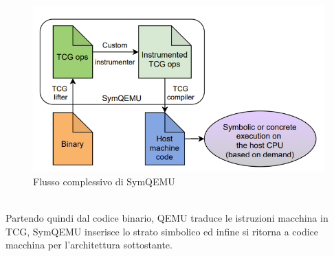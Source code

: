 \documentclass[Lau, oneside]{sapthesis}%
\begin{document}
\begin{figure}[h]
    \centering
    \includegraphics[width=0.7\linewidth]{foto/flusso_symqemu.png}
    \caption{Flusso complessivo di SymQEMU}
    \label{fig:flusso_symqemu}
\end{figure}
\ \\
Partendo quindi dal codice binario, QEMU traduce le istruzioni macchina in TCG, SymQEMU inserisce lo strato simbolico ed infine si ritorna a codice macchina per l'architettura sottostante.

\newpage
\end{document}
